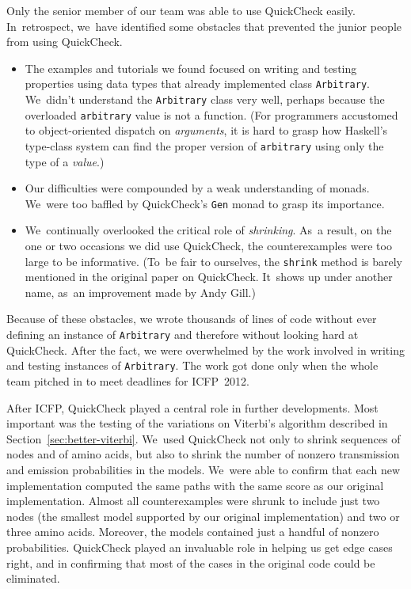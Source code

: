\documentclass[]{jfp1}
\newcommand\secref[1]{Section~\ref{sec:#1}}
\begin{document}
Only the senior member of our team was able to use
QuickCheck easily.
In~retrospect, we~have identified some obstacles that prevented the
junior people from using
QuickCheck.
\begin{itemize}
\item
The examples and tutorials we found focused 
on writing and testing properties using data types that
already implemented class \texttt{Arbitrary}.
We~didn't understand the \texttt{Arbitrary} class very well, 
perhaps because the overloaded \texttt{arbitrary} value is not a
function.
(For programmers accustomed to object-oriented dispatch
on \emph{arguments}, it is hard to grasp how Haskell's type-class
system can find the proper version
of \texttt{arbitrary} using only the type of a \emph{value}.)
\item
Our difficulties were compounded by a weak understanding of monads.
We~were too baffled by QuickCheck's \texttt{Gen} monad to grasp its
importance.
\item
We~continually overlooked the critical role of \emph{shrinking}.
As~a result, on the one or two occasions we did 
use QuickCheck, the counterexamples were too large to be
informative. 
(To~be fair to ourselves, the \texttt{shrink} method is barely
mentioned in the original 
paper on QuickCheck.
It~shows up under another name, as~an improvement made by Andy Gill.)
\end{itemize}
Because of these obstacles, 
we wrote thousands of lines of code without ever defining an instance
of \texttt{Arbitrary} and therefore
without looking hard at QuickCheck.
After the fact, we were overwhelmed by the work
involved in writing and testing instances
of
\texttt{Arbitrary}.
The work got done only when the whole team pitched in to
meet deadlines for ICFP~2012.

After ICFP, 
QuickCheck played a central role in further developments.
Most important was the testing of the variations on Viterbi's
algorithm described in \secref{better-viterbi}.
We~used QuickCheck not only to shrink sequences of nodes and of amino
acids, but also to shrink the number of nonzero transmission and
emission probabilities in the models.
We~were able to confirm that each new implementation computed the same
paths with the same score as our original implementation.
Almost all counterexamples were shrunk to include just two nodes 
(the smallest model supported by our original implementation)
and two or three amino acids.
Moreover, the models contained just a handful of nonzero
probabilities.
QuickCheck played an invaluable role in helping us get edge cases
right, and in confirming that most of the cases in the original code
could be eliminated.
\end{document}
